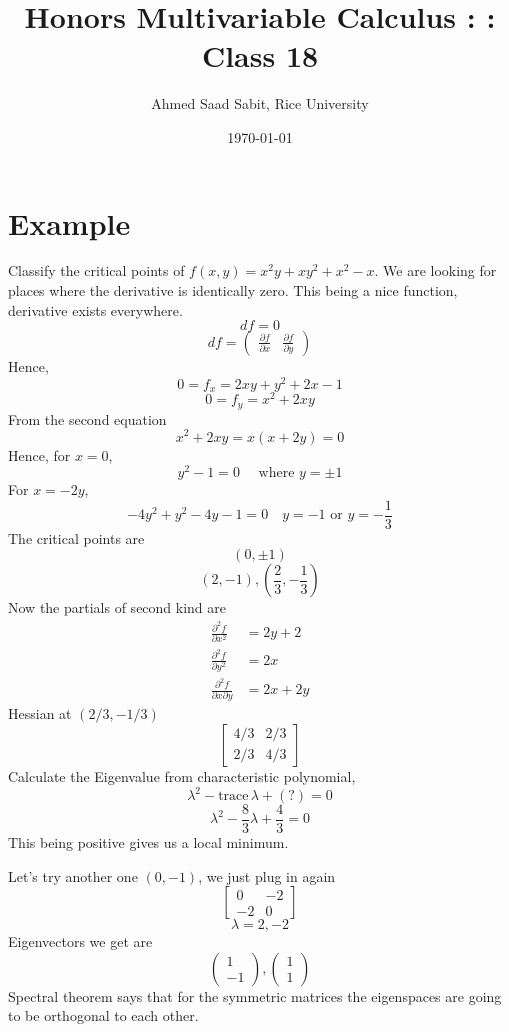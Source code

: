 \documentclass[letter]{article}
\title{Honors Multivariable Calculus : : Class 18}
\author{Ahmed Saad Sabit, Rice University}
\date{\today}
\begin{document}
\maketitle
\section*{Example}
Classify the critical points of $f(x,y) = x^2 y + xy^2 + x^2 - x$. We are looking for places where the derivative is identically zero. This being a nice function, derivative exists everywhere. 
\[
df{
 = 0
}
\] 
\[
	d f = \begin{pmatrix} \frac{\partial f}{\partial x} & \frac{\partial f }{\partial y} \end{pmatrix} 
\] 
Hence, 
\[
0 = f_x = 2xy + y^2 + 2x - 1
\] 
\[
0 = f_y = x^2 + 2 xy 
\] 
From the second equation
\[
x^2 + 2 xy = x ( x+ 2y) = 0
\] 
Hence, for $x = 0$, 
\[
y^2 - 1 = 0 \quad \text{ where } y = \pm 1
\] 
For $x = -2y$,
\[
-4y^2 + y^2 -4 y - 1 = 0 \quad y = -1 \text{ or } y = - \frac{1}{3}
\]
The critical points are 
\[
	(0, \pm 1)
\]
\[
	(2, -1) , (\frac{2}{3}, -\frac{1}{3})
\]
Now the partials of second kind are
\begin{align*}
	\frac{\partial^2f}{\partial x^2} &= 2y + 2 \\
	\frac{\partial ^2 f}{\partial y^2} &= 2x \\
	\frac{\partial ^2 f}{\partial x \partial y} &= 2 x + 2y 
\end{align*}
Hessian at $( 2 / 3, - {1} / {3})$ 
\[
	\begin{bmatrix} 4 / 3 & 2 / 3 \\ 
	2 / 3 & 4 /3 \end{bmatrix} 
\]
Calculate the Eigenvalue from characteristic polynomial, 
\[
\lambda^2 - \text{trace} \, \lambda + (?) = 0 
\]
\[
\lambda^2 - \frac{8}{3} \lambda + \frac{4}{3} = 0
\]
This being positive gives us a local minimum.

Let's try another one $(0,-1)$, we just plug in again
\[
	\begin{bmatrix} 0 & -2 \\ -2 & 0 \end{bmatrix} 
\] 
\[
\lambda = 2, -2 
\]
Eigenvectors we get are
\[
\begin{pmatrix} 1 \\ -1 \end{pmatrix} , \begin{pmatrix} 1 \\ 1 \end{pmatrix} 
\]
Spectral theorem says that for the symmetric matrices the eigenspaces are going to be orthogonal to each other. 
\end{document}
